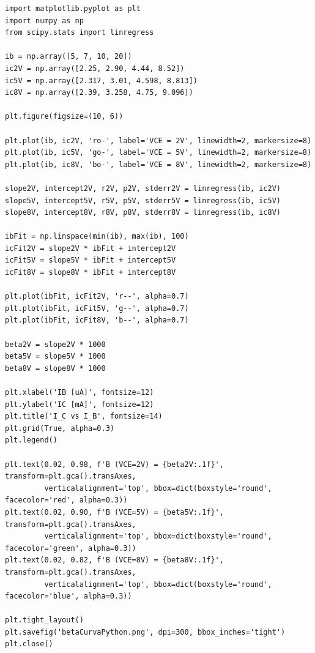 \newpage
\begin{verbatim}
import matplotlib.pyplot as plt
import numpy as np
from scipy.stats import linregress

ib = np.array([5, 7, 10, 20])
ic2V = np.array([2.25, 2.90, 4.44, 8.52])
ic5V = np.array([2.317, 3.01, 4.598, 8.813])
ic8V = np.array([2.39, 3.258, 4.75, 9.096])

plt.figure(figsize=(10, 6))

plt.plot(ib, ic2V, 'ro-', label='VCE = 2V', linewidth=2, markersize=8)
plt.plot(ib, ic5V, 'go-', label='VCE = 5V', linewidth=2, markersize=8)
plt.plot(ib, ic8V, 'bo-', label='VCE = 8V', linewidth=2, markersize=8)

slope2V, intercept2V, r2V, p2V, stderr2V = linregress(ib, ic2V)
slope5V, intercept5V, r5V, p5V, stderr5V = linregress(ib, ic5V)
slope8V, intercept8V, r8V, p8V, stderr8V = linregress(ib, ic8V)

ibFit = np.linspace(min(ib), max(ib), 100)
icFit2V = slope2V * ibFit + intercept2V
icFit5V = slope5V * ibFit + intercept5V
icFit8V = slope8V * ibFit + intercept8V

plt.plot(ibFit, icFit2V, 'r--', alpha=0.7)
plt.plot(ibFit, icFit5V, 'g--', alpha=0.7)
plt.plot(ibFit, icFit8V, 'b--', alpha=0.7)

beta2V = slope2V * 1000
beta5V = slope5V * 1000
beta8V = slope8V * 1000

plt.xlabel('IB [uA]', fontsize=12)
plt.ylabel('IC [mA]', fontsize=12)
plt.title('I_C vs I_B', fontsize=14)
plt.grid(True, alpha=0.3)
plt.legend()

plt.text(0.02, 0.98, f'B (VCE=2V) = {beta2V:.1f}', transform=plt.gca().transAxes, 
         verticalalignment='top', bbox=dict(boxstyle='round', facecolor='red', alpha=0.3))
plt.text(0.02, 0.90, f'B (VCE=5V) = {beta5V:.1f}', transform=plt.gca().transAxes, 
         verticalalignment='top', bbox=dict(boxstyle='round', facecolor='green', alpha=0.3))
plt.text(0.02, 0.82, f'B (VCE=8V) = {beta8V:.1f}', transform=plt.gca().transAxes, 
         verticalalignment='top', bbox=dict(boxstyle='round', facecolor='blue', alpha=0.3))

plt.tight_layout()
plt.savefig('betaCurvaPython.png', dpi=300, bbox_inches='tight')
plt.close()
\end{verbatim}

\valentinoPoneLasColumnas{}

